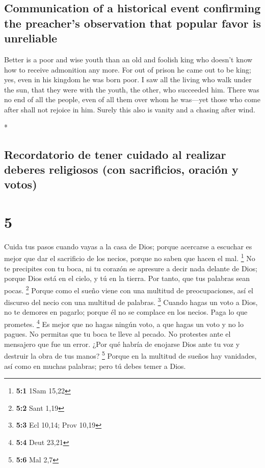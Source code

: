 \begin{paracol}{2}
\begin{otherlanguage}{english}
\hypertarget{communication-of-a-historical-event-confirming-the-preachers-observation-that-popular-favor-is-unreliable}{%
\subsection{Communication of a historical event confirming the
preacher's observation that popular favor is
unreliable}\label{communication-of-a-historical-event-confirming-the-preachers-observation-that-popular-favor-is-unreliable}}

 Better is a poor and wise youth than an old and foolish
king who doesn't know how to receive admonition any more.
 For out of prison he came out to be king; yes, even in
his kingdom he was born poor.  I saw all the living who
walk under the sun, that they were with the youth, the other, who
succeeded him.  There was no end of all the people, even
of all them over whom he was---yet those who come after shall not
rejoice in him. Surely this also is vanity and a chasing after wind.

\end{otherlanguage}

\switchcolumn[0]*

\hypertarget{recordatorio-de-tener-cuidado-al-realizar-deberes-religiosos-con-sacrificios-oraciuxf3n-y-votos}{%
\subsection{Recordatorio de tener cuidado al realizar deberes religiosos
(con sacrificios, oración y
votos)}\label{recordatorio-de-tener-cuidado-al-realizar-deberes-religiosos-con-sacrificios-oraciuxf3n-y-votos}}

\hypertarget{section-8}{%
\section{5}\label{section-8}}

 Cuida tus pasos cuando vayas a la casa de Dios; porque
acercarse a escuchar es mejor que dar el sacrificio de los necios,
porque no saben que hacen el mal. \footnote{\textbf{5:1} 1Sam 15,22}
 No te precipites con tu boca, ni tu corazón se apresure a
decir nada delante de Dios; porque Dios está en el cielo, y tú en la
tierra. Por tanto, que tus palabras sean pocas. \footnote{\textbf{5:2}
  Sant 1,19}  Porque como el sueño viene con una multitud
de preocupaciones, así el discurso del necio con una multitud de
palabras. \footnote{\textbf{5:3} Ecl 10,14; Prov 10,19} 
Cuando hagas un voto a Dios, no te demores en pagarlo; porque él no se
complace en los necios. Paga lo que prometes. \footnote{\textbf{5:4}
  Deut 23,21}  Es mejor que no hagas ningún voto, a que
hagas un voto y no lo pagues.  No permitas que tu boca te
lleve al pecado. No protestes ante el mensajero que fue un error. ¿Por
qué habría de enojarse Dios ante tu voz y destruir la obra de tus manos?
\footnote{\textbf{5:6} Mal 2,7}  Porque en la multitud de
sueños hay vanidades, así como en muchas palabras; pero tú debes temer a
Dios.


\end{paracol}
